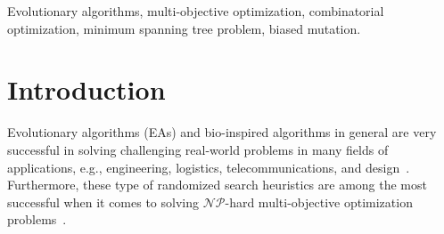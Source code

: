 \documentclass[twoside]{article}
\begin{document}
\begin{keywords}

Evolutionary algorithms,
multi-objective optimization,
combinatorial optimization,
minimum spanning tree problem,
biased mutation.

\end{keywords}


\section{Introduction}
\label{sec:introduction}

Evolutionary algorithms (EAs) and bio-inspired algorithms in general are very successful in solving challenging real-world problems in many fields of applications, e.g., engineering, logistics, telecommunications, and design~\citep{D12,CWM12}. Furthermore, these type of randomized search heuristics are among the most successful when it comes to solving $\mathcal{NP}$-hard multi-objective optimization problems~\citep{DPAM02,beume2007,CCC2007}.
\end{document}
